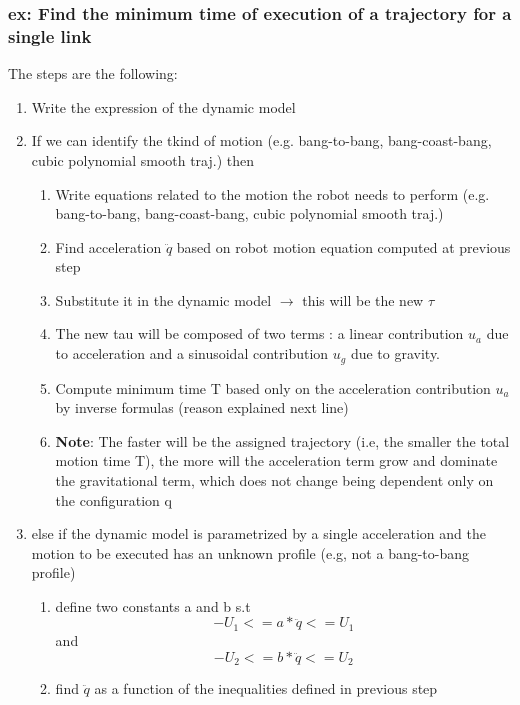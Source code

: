 \documentclass[a4paper,12pt]{article}
\begin{document}
\subsubsection{ex: Find the minimum time of execution of a trajectory for a single link}
The steps are the following:
\begin{enumerate}
    \item Write the expression of the dynamic model 
    \item If we can identify the tkind of motion
     (e.g. bang-to-bang, bang-coast-bang,
      cubic polynomial smooth traj.) then \begin{enumerate}
    \item Write equations related to the
     motion the robot needs to perform
      (e.g. bang-to-bang, bang-coast-bang, 
      cubic polynomial smooth traj.) 
    \item Find acceleration $\ddot{q}$ based on robot 
    motion equation computed at previous step 
    \item Substitute it in the dynamic model $\rightarrow$ this
     will be the new $\tau$
    \item The new tau will be composed of two terms : a linear contribution $u_a$ due to acceleration and a sinusoidal contribution $u_g$ due to gravity. 
    \item Compute minimum time T based only on the acceleration contribution $u_a$ by inverse formulas (reason explained next line)
    \item \textbf{Note}: The faster will be the assigned trajectory (i.e, the smaller the total motion time T),
     the more will the acceleration term grow and dominate the gravitational term, which does not change being dependent only on the configuration q 
\end{enumerate}
\item else if the dynamic model is parametrized by a single acceleration and the motion to be executed has an unknown profile (e.g, not a bang-to-bang profile) \begin{enumerate}
 \item define two constants a and b s.t 
 \begin{equation}
 -U_1 <= a*\ddot{q} <= U_1
    \end{equation}
 and 
    \begin{equation}
 -U_2 <= b*\ddot{q} <= U_2
 \end{equation}
 \item find $\ddot{q}$ as a function of 
 the inequalities defined in previous step

\end{enumerate}
\end{enumerate}
\end{document}
